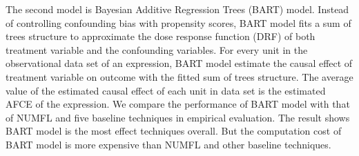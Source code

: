 The second model is Bayesian Additive Regression Trees (BART) model. Instead of controlling confounding bias with propensity scores, BART model fits a sum of trees structure to approximate the dose response function (DRF) of both treatment variable and the confounding variables. For every unit in the observational data set of an expression, BART model estimate the causal effect of treatment variable on outcome with the fitted sum of trees structure. The average value of the estimated causal effect of each unit in data set is the estimated AFCE of the expression. We compare the performance of BART model with that of NUMFL and five baseline techniques in empirical evaluation. The result shows BART model is the most effect techniques overall.  But the computation cost of BART model is more expensive than NUMFL and other baseline techniques.









